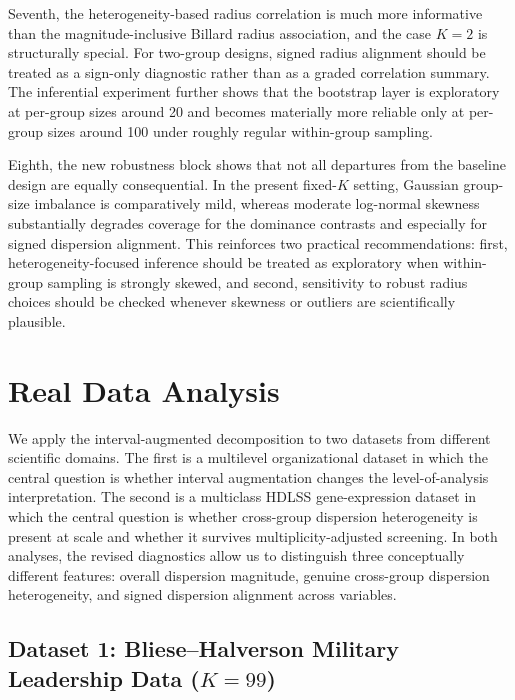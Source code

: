 \documentclass[preprint, times, 12pt, authoryear]{elsarticle}
\begin{document}
Seventh, the heterogeneity-based radius correlation is much more informative than the magnitude-inclusive Billard radius association, and the case $K=2$ is structurally special. For two-group designs, signed radius alignment should be treated as a sign-only diagnostic rather than as a graded correlation summary. The inferential experiment further shows that the bootstrap layer is exploratory at per-group sizes around 20 and becomes materially more reliable only at per-group sizes around 100 under roughly regular within-group sampling.

Eighth, the new robustness block shows that not all departures from the baseline design are equally consequential. In the present fixed-$K$ setting, Gaussian group-size imbalance is comparatively mild, whereas moderate log-normal skewness substantially degrades coverage for the dominance contrasts and especially for signed dispersion alignment. This reinforces two practical recommendations: first, heterogeneity-focused inference should be treated as exploratory when within-group sampling is strongly skewed, and second, sensitivity to robust radius choices should be checked whenever skewness or outliers are scientifically plausible.



\section{Real Data Analysis}\label{sec:realdata}

We apply the interval-augmented decomposition to two datasets from different scientific domains. The first is a multilevel organizational dataset in which the central question is whether interval augmentation changes the level-of-analysis interpretation. The second is a multiclass HDLSS gene-expression dataset in which the central question is whether cross-group dispersion heterogeneity is present at scale and whether it survives multiplicity-adjusted screening. In both analyses, the revised diagnostics allow us to distinguish three conceptually different features: overall dispersion magnitude, genuine cross-group dispersion heterogeneity, and signed dispersion alignment across variables.

\subsection{Dataset 1: Bliese--Halverson Military Leadership Data ($K=99$)}\label{sec:data_bh1996}
\end{document}

